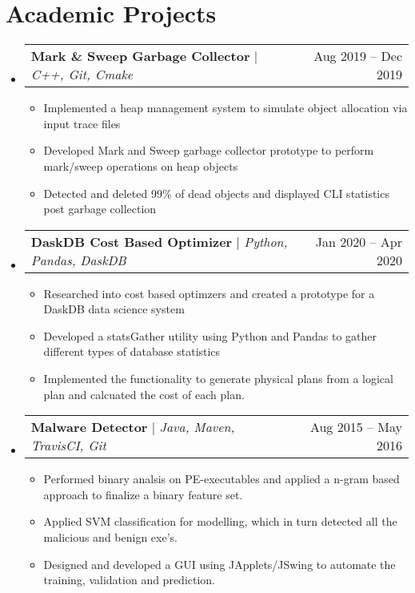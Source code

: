 \documentclass[letterpaper,10pt]{article}
\makeatletter
\newcommand{\resumeItem}[1]{
  \item\small{
    {#1 \vspace{-2pt}}
  }
}
\newcommand{\resumeProjectHeading}[2]{
    \item
    \begin{tabular*}{0.97\textwidth}{l@{\extracolsep{\fill}}r}
      \small#1 & #2 \\
    \end{tabular*}\vspace{-7pt}
}
\newcommand{\resumeSubHeadingListStart}{\begin{itemize}[leftmargin=0.15in, label={}]}
\newcommand{\resumeSubHeadingListEnd}{\end{itemize}}
\newcommand{\resumeItemListStart}{\begin{itemize}}
\newcommand{\resumeItemListEnd}{\end{itemize}\vspace{-5pt}}
\makeatother
\begin{document}
\section{Academic Projects}
    \resumeSubHeadingListStart
    \resumeProjectHeading
          {\textbf{Mark \& Sweep Garbage Collector} $|$ \emph{C++, Git, Cmake}}{Aug 2019 -- Dec 2019}
          \resumeItemListStart
            \resumeItem{Implemented a heap management system to simulate object allocation via input trace files}
            \resumeItem{Developed Mark and Sweep garbage collector prototype to perform mark/sweep operations on heap objects}
            \resumeItem{Detected and deleted 99\% of dead objects and displayed CLI statistics post garbage collection}
          \resumeItemListEnd  
    \resumeProjectHeading
          {\textbf{DaskDB Cost Based Optimizer} $|$ \emph{Python, Pandas, DaskDB}}{Jan 2020 -- Apr 2020}
          \resumeItemListStart
            \resumeItem{Researched into cost based optimzers and created a prototype for a DaskDB data science system}
            \resumeItem{Developed a statsGather utility using Python and Pandas to gather different types of database statistics}
            \resumeItem{Implemented the functionality to generate physical plans from a logical plan and calcuated the cost of each plan.}
          \resumeItemListEnd
      \resumeProjectHeading
          {\textbf{Malware Detector} $|$ \emph{Java, Maven, TravisCI, Git}}{Aug 2015 -- May 2016}
          \resumeItemListStart
            \resumeItem{Performed binary analsis on PE-executables and applied a n-gram based approach to finalize a binary feature set.}
            \resumeItem{Applied SVM classification for modelling, which in turn detected all the malicious and benign exe's.}
            \resumeItem{Designed and developed a GUI using JApplets/JSwing to automate the training, validation and prediction.}
          \resumeItemListEnd
    \resumeSubHeadingListEnd
\end{document}
